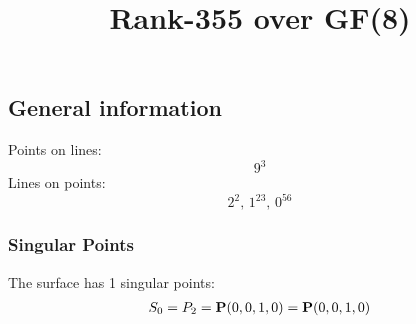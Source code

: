 \documentclass{article}
\newcommand\setTBstruts{\def\T{\rule{0pt}{2.6ex}}%
\def\B{\rule[-1.2ex]{0pt}{0pt}}}
\newcommand{\bP}{{\bf P}}
\begin{document}
 
\setTBstruts



{\allowdisplaybreaks%






\title{Rank-355 over GF(8)}
\author{}%
\maketitle%
%
{}



\subsection*{General information}
Points on lines:
$$
9^3$$
Lines on points:
$$
2^2,\,1^{23},\,0^{56}$$
\subsubsection*{Singular Points}
The surface has 1 singular points:\\
\begin{align*}
S_{0} &= P_{2}=\bP(0, 0, 1, 0) = \bP(0, 0, 1, 0)\\
\end{align*}
}
\end{document}
